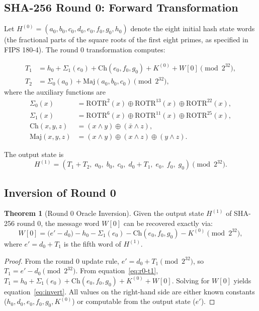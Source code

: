 \documentclass[11pt,a4paper]{article}
\theoremstyle{definition}
\newtheorem{theorem}{Theorem}[section]
\begin{document}
\subsection{SHA-256 Round 0: Forward Transformation}

Let $H^{(0)} = (a_0, b_0, c_0, d_0, e_0, f_0, g_0, h_0)$ denote the eight initial hash state words (the fractional parts of the square roots of the first eight primes, as specified in FIPS 180-4). The round 0 transformation computes:

\begin{align}
T_1 &= h_0 + \Sigma_1(e_0) + \mathrm{Ch}(e_0, f_0, g_0) + K^{(0)} + W[0] \pmod{2^{32}}, \label{eq:r0-t1} \\
T_2 &= \Sigma_0(a_0) + \mathrm{Maj}(a_0, b_0, c_0) \pmod{2^{32}}, \label{eq:r0-t2}
\end{align}
where the auxiliary functions are
\begin{align}
\Sigma_0(x) &= \mathrm{ROTR}^2(x) \oplus \mathrm{ROTR}^{13}(x) \oplus \mathrm{ROTR}^{22}(x), \\
\Sigma_1(x) &= \mathrm{ROTR}^6(x) \oplus \mathrm{ROTR}^{11}(x) \oplus \mathrm{ROTR}^{25}(x), \\
\mathrm{Ch}(x, y, z) &= (x \wedge y) \oplus (\bar{x} \wedge z), \\
\mathrm{Maj}(x, y, z) &= (x \wedge y) \oplus (x \wedge z) \oplus (y \wedge z).
\end{align}

The output state is
\begin{equation}
H^{(1)} = (T_1 + T_2,\; a_0,\; b_0,\; c_0,\; d_0 + T_1,\; e_0,\; f_0,\; g_0) \pmod{2^{32}}.
\end{equation}

\subsection{Inversion of Round 0}

\begin{theorem}[Round 0 Oracle Inversion]\label{thm:oracle}
Given the output state $H^{(1)}$ of SHA-256 round 0, the message word $W[0]$ can be recovered exactly via:
\begin{equation}\label{eq:invert}
W[0] = \big(e' - d_0\big) - h_0 - \Sigma_1(e_0) - \mathrm{Ch}(e_0, f_0, g_0) - K^{(0)} \pmod{2^{32}},
\end{equation}
where $e' = d_0 + T_1$ is the fifth word of $H^{(1)}$.
\end{theorem}

\begin{proof}
From the round 0 update rule, $e' = d_0 + T_1 \pmod{2^{32}}$, so $T_1 = e' - d_0 \pmod{2^{32}}$. From equation~\eqref{eq:r0-t1}, $T_1 = h_0 + \Sigma_1(e_0) + \mathrm{Ch}(e_0, f_0, g_0) + K^{(0)} + W[0]$. Solving for $W[0]$ yields equation~\eqref{eq:invert}. All values on the right-hand side are either known constants ($h_0, d_0, e_0, f_0, g_0, K^{(0)}$) or computable from the output state ($e'$).
\end{proof}
\end{document}
